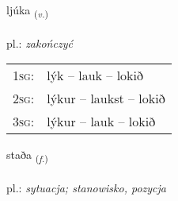 \documentclass[frontgrid, backgrid]{flacards}\usepackage[]{graphicx}\usepackage[]{xcolor}
\begin{document}
\renewcommand{\blhead}{\vskip5pt {\small\bfseries\footnotesize Sagnorð | czasownik }}
\renewcommand{\bcfoot}{\vskip5pt \hspace{2pt}{\small\bfseries\footnotesize 1K}}


{ljúka \small{\textsubscript{(\textit{v.})}} \\[1ex] %
\textphonetic{[ljuːka]} \\
pl.: \emph{zakończyć} \\  [2ex]
\renewcommand*{\arraystretch}{0.8}
\begin{tabular}{p{1cm}l}
\textsc{1sg}: & lýk -- lauk -- lokið \\ 
\textsc{2sg}: & lýkur -- laukst -- lokið \\ 
\textsc{3sg}: & lýkur -- lauk -- lokið \\ 
\end{tabular}
}

\renewcommand{\flhead}{\vskip5pt \fboxsep=0pt {\small\bfseries\footnotesize Nafnorð | rzeczownik}}
\renewcommand{\fcfoot}{\vskip5pt \fboxsep=0pt \hspace{2pt}{\small\bfseries\footnotesize 1K}}

\renewcommand{\blhead}{\vskip5pt {\small\bfseries\footnotesize Nafnorð | rzeczownik }}
\renewcommand{\bcfoot}{\vskip5pt \hspace{2pt}{\small\bfseries\footnotesize 1K}}


{staða \small{\textsubscript{(\textit{f.})}} \\[1ex] %
\textphonetic{[staːða]} \\
pl.: \emph{sytuacja; stanowisko, pozycja} \\  [2ex]
\renewcommand*{\arraystretch}{0.8}
}

\renewcommand{\flhead}{\vskip5pt \fboxsep=0pt {\small\bfseries\footnotesize Sagnorð | czasownik}}
\renewcommand{\fcfoot}{\vskip5pt \fboxsep=0pt \hspace{2pt}{\small\bfseries\footnotesize 1K}}
\end{document}
